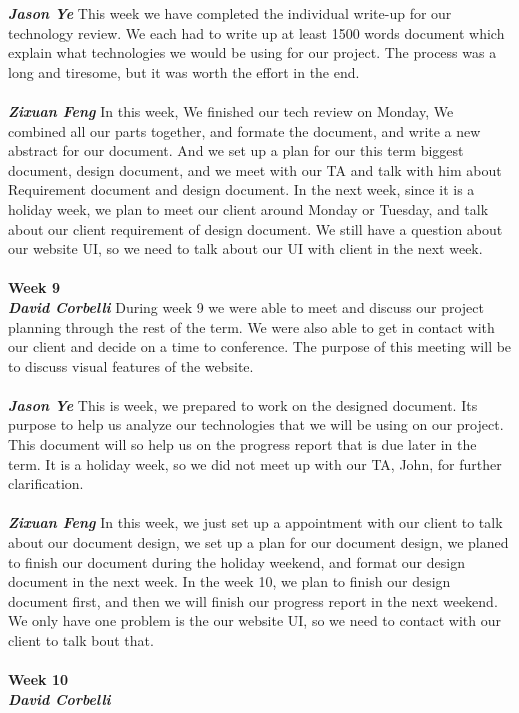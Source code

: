 \documentclass[onecolumn, draftclsnofoot,10pt, compsoc]{IEEEtran}
\begin{document}
\noindent\textbf{\textit{Jason Ye}}
This week we have completed the individual write-up for our technology review. We each had to write up at least 1500 words document which explain what technologies we would be using for our project. The process was a long and tiresome, but it was worth the effort in the end.\\ \\
\textbf{\textit{Zixuan Feng}}
In this week, We finished our tech review on Monday, We combined all our parts together, and formate the document, and write a new abstract for our document. And we set up a plan for our this term biggest document, design document, and we meet with our TA and talk with him about Requirement document and design document. In the next week, since it is a holiday week, we plan to meet our client around Monday or Tuesday, and talk about our client requirement of design document. We still have a question about our website UI, so we need to talk about our UI with client in the next week.\\ \\
\textbf{Week 9}
\\ \textbf{\textit{David Corbelli}}
During week 9 we were able to meet and discuss our project planning through the rest of the term. We were also able to get in contact with our client and decide on a time to conference. The purpose of this meeting will be to discuss visual features of the website.\\ \\
\textbf{\textit{Jason Ye}}
This is week, we prepared to work on the designed document. Its purpose to help us analyze our technologies that we will be using on our project. This document will so help us on the progress report that is due later in the term. It is a holiday week, so we did not meet up with our TA, John, for further clarification.\\ \\
\textbf{\textit{Zixuan Feng}}
In this week, we just set up a appointment with our client to talk about our document design, we set up a plan for our document design, we planed to finish our document during the holiday weekend, and format our design document in the next week. In the week 10, we plan to finish our design document first, and then we will finish our progress report in the next weekend. We only have one problem is the our website UI, so we need to contact with our client to talk bout that.\\ \\
\textbf{Week 10}
\\ \textbf{\textit{David Corbelli}}
\end{document}
